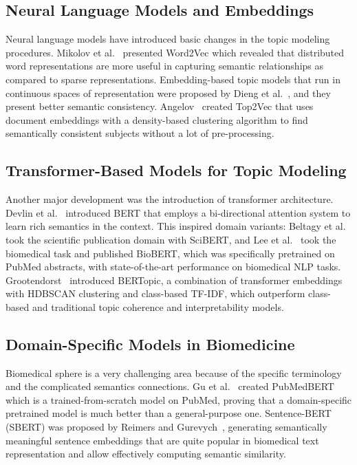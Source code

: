 \documentclass[authorproof,JACIII,researchpaper]{fujipressarticle}
\begin{document}
\subsection{Neural Language Models and Embeddings}

Neural language models have introduced basic changes in the topic modeling procedures. Mikolov et al.~\cite{mikolov_efficient_2013} presented Word2Vec which revealed that distributed word representations are more useful in capturing semantic relationships as compared to sparse representations. Embedding-based topic models that run in continuous spaces of representation were proposed by Dieng et al.~\cite{dieng_topic_2020}, and they present better semantic consistency. Angelov~\cite{angelov_top2vec_2020} created Top2Vec that uses document embeddings with a density-based clustering algorithm to find semantically consistent subjects without a lot of pre-processing.

\subsection{Transformer-Based Models for Topic Modeling}

Another major development was the introduction of transformer architecture. Devlin et al.~\cite{devlin_bert_2019} introduced BERT that employs a bi-directional attention system to learn rich semantics in the context. This inspired domain variants: Beltagy et al.~\cite{beltagy_scibert_2019} took the scientific publication domain with SciBERT, and Lee et al.~\cite{lee_biobert_2020} took the biomedical task and published BioBERT, which was specifically pretrained on PubMed abstracts, with state-of-the-art performance on biomedical NLP tasks. Grootendorst~\cite{grootendorst_bertopic_2022} introduced BERTopic, a combination of transformer embeddings with HDBSCAN clustering and class-based TF-IDF, which outperform class-based and traditional topic coherence and interpretability models.

\subsection{Domain-Specific Models in Biomedicine}

Biomedical sphere is a very challenging area because of the specific terminology and the complicated semantics connections. Gu et al.~\cite{gu_domain_2022} created PubMedBERT which is a trained-from-scratch model on PubMed, proving that a domain-specific pretrained model is much better than a general-purpose one. Sentence-BERT (SBERT) was proposed by Reimers and Gurevych~\cite{reimers_sentence-bert_2019}, generating semantically meaningful sentence embeddings that are quite popular in biomedical text representation and allow effectively computing semantic similarity.
\end{document}
